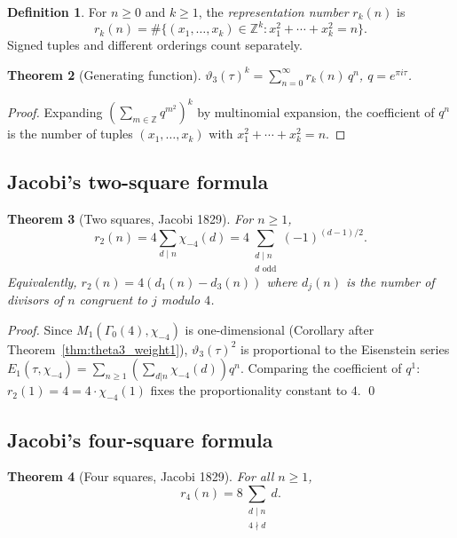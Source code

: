 \documentclass[12pt,a4paper]{amsart}
\newtheorem{theorem}{Theorem}[section]
\theoremstyle{definition}
\newtheorem{definition}[theorem]{Definition}
\begin{document}
\begin{definition}
For $n \geq 0$ and $k \geq 1$, the \emph{representation number} $r_k(n)$ is
\[
  r_k(n) = \#\{(x_1,\ldots,x_k)\in\mathbb{Z}^k : x_1^2+\cdots+x_k^2 = n\}.
\]
Signed tuples and different orderings count separately.
\end{definition}

\begin{theorem}[Generating function]\label{thm:gen_rk}
$\displaystyle\vartheta_3(\tau)^k = \sum_{n=0}^{\infty} r_k(n)\, q^n$,
\quad $q = e^{\pi i\tau}$.
\end{theorem}

\begin{proof}
Expanding $(\sum_{m\in\mathbb{Z}} q^{m^2})^k$ by multinomial expansion,
the coefficient of $q^n$ is the number of tuples $(x_1,\ldots,x_k)$ with
$x_1^2+\cdots+x_k^2 = n$.
\end{proof}

\subsection{Jacobi's two-square formula}

\begin{theorem}[Two squares, Jacobi 1829]\label{thm:r2}
For $n \geq 1$,
\[
  r_2(n) = 4\sum_{d \mid n} \chi_{-4}(d)
  = 4\!\!\sum_{\substack{d \mid n \\ d \text{ odd}}} (-1)^{(d-1)/2}.
\]
Equivalently, $r_2(n) = 4(d_1(n) - d_3(n))$ where $d_j(n)$ is the number of
divisors of $n$ congruent to $j$ modulo $4$.
\end{theorem}

\begin{proof}
Since $M_1(\Gamma_0(4),\chi_{-4})$ is one-dimensional (Corollary after
Theorem~\ref{thm:theta3_weight1}), $\vartheta_3(\tau)^2$ is proportional to the
Eisenstein series $E_1(\tau,\chi_{-4}) = \sum_{n\geq1}(\sum_{d|n}\chi_{-4}(d))q^n$.
Comparing the coefficient of $q^1$: $r_2(1) = 4 = 4\cdot\chi_{-4}(1)$
fixes the proportionality constant to $4$. \qed
\end{proof}

\subsection{Jacobi's four-square formula}

\begin{theorem}[Four squares, Jacobi 1829]\label{thm:r4}
For all $n \geq 1$,
\begin{equation}\label{eq:r4}
  r_4(n) = 8\sum_{\substack{d \mid n \\ 4 \nmid d}} d.
\end{equation}
\end{theorem}
\end{document}
